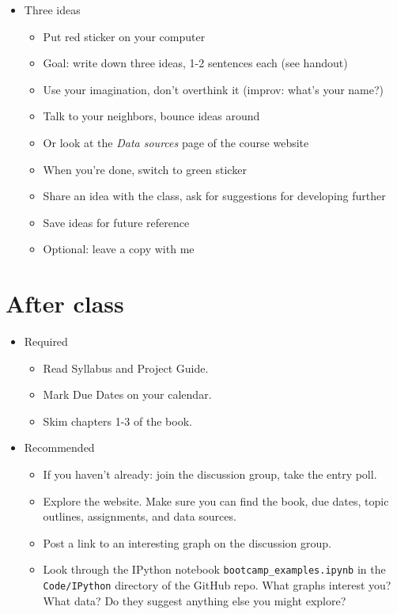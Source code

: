 \documentclass[11pt]{article}
\begin{document}
\begin{itemize}
\item Three ideas
\begin{itemize}
\item Put red sticker on your computer
\item Goal:  write down three ideas, 1-2 sentences each (see handout)
\item Use your imagination, don't overthink it (improv: what's your name?)
\item Talk to your neighbors, bounce ideas around
\item Or look at the {\it Data sources\/} page of the course website
\item When you're done, switch to green sticker
\item Share an idea with the class, ask for suggestions for developing further
\item Save ideas for future reference
\item Optional:  leave a copy with me
\end{itemize}
\end{itemize}


\section*{After class}

\begin{itemize}
\item Required
\begin{itemize}
\item Read Syllabus and Project Guide.
\item Mark Due Dates on your calendar.
\item Skim chapters 1-3 of the book.
\end{itemize}
\item Recommended
\begin{itemize}
\item If you haven't already:  join the discussion group, take the entry poll.
\item Explore the website.  Make sure you can find the book, due dates,
topic outlines, assignments, and data sources.
\item Post a link to an interesting graph on the discussion group.
\item Look through the IPython notebook \verb|bootcamp_examples.ipynb|
in the {\tt Code/IPython} directory of the GitHub repo.
What graphs interest you?  What data?
Do they suggest anything else you might explore?
\end{itemize}
\end{itemize}


\end{document}
